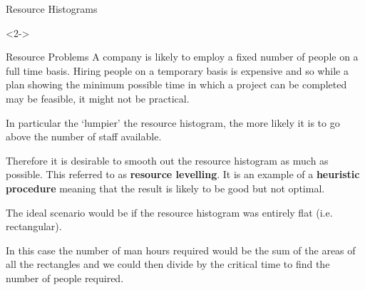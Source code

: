 \documentclass[8pt]{beamer}
\begin{document}
\begin{frame}[shrink=5]{Resource Histograms}
\begin{solution}<2->
	\begin{center}
			\end{center}
\end{solution}

\end{frame}

\begin{frame}{Resource Problems}
	A company is likely to employ a fixed number of people on a full time basis. Hiring people on a temporary basis is expensive and so while a plan showing the minimum possible time in which a project can be completed may be feasible, it might not be practical.

In particular the ‘lumpier’ the resource histogram, the more likely it is to go above the number of staff available.

\begin{definition}
	Therefore it is desirable to smooth out the resource histogram as much as possible. This referred to as \textbf{resource levelling}. It is an example of a \textbf{heuristic procedure} meaning that the result is likely to be good but not optimal.
\end{definition}

The ideal scenario would be if the resource histogram was entirely flat (i.e. rectangular).

In this case the number of man hours required would be the sum of the areas of all the rectangles and we could then divide by the critical time to find the number of people required.
\end{frame}
\end{document}
